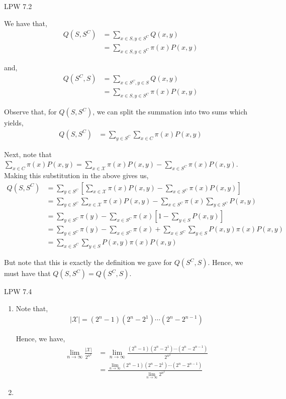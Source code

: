 \documentclass[12pt]{article}
\newenvironment{problem}[2][Problem]{\begin{trivlist}
\item[\hskip \labelsep {\bfseries #1}\hskip \labelsep {\bfseries #2.}]}{\end{trivlist}}
\begin{document}
\begin{problem}{III}
LPW 7.2
\end{problem}

We have that,
\begin{align*}
Q(S, S^C) &= \sum_{x \in S, y \in S^C} Q(x,y)\\
&= \sum_{x \in S, y \in S^C} \pi(x) P(x,y)
\end{align*}

and,
\begin{align*}
Q(S^C, S) &= \sum_{x \in S^C,  y \in S} Q(x, y)\\
&= \sum_{x \in S, y \in S^C} \pi(x) P(x,y)
\end{align*}

Observe that, for $Q(S, S^C)$, we can split the summation into two sums which yields,
\begin{align*}
Q(S, S^C) &= \sum_{y \in S^C} \sum_{x \in C} \pi(x) P(x,y)
\end{align*}

Next, note that $\sum_{x \in C} \pi(x) P(x,y) = \sum_{x \in \mathcal{X}} \pi(x) P(x,y) - \sum_{x \in S^C} \pi(x) P(x,y)$. Making this substitution in the above gives us,
\begin{align*}
Q(S, S^C) &= \sum_{y \in S^C} [\sum_{x \in \mathcal{X}} \pi(x) P(x,y) - \sum_{x \in S^C} \pi(x) P(x,y)]\\
&= \sum_{y \in S^C} \sum_{x \in \mathcal{X}} \pi(x) P(x,y) - \sum_{x \in S^C} \pi(x) \sum_{y \in S^C} P(x,y)\\
&= \sum_{y \in S^C} \pi(y) - \sum_{x \in S^C} \pi(x) \left[ 1 - \sum_{y \in S} P(x, y) \right]\\
&= \sum_{y \in S^C} \pi(y) - \sum_{x \in S^C} \pi(x) + \sum_{x \in S^C} \sum_{y \in S} P(x, y) \pi(x) P(x, y)\\
&= \sum_{x \in S^C} \sum_{y \in S} P(x, y) \pi(x) P(x, y)
\end{align*}

But note that this is exactly the definition we gave for $Q(S^C, S)$. Hence, we must have that $Q(S, S^C) = Q(S^C, S)$.

\newpage
\begin{problem}{IV}
LPW 7.4
\end{problem}

\begin{enumerate}[label=(\alph*)]

\item Note that,
\begin{align*}
|\mathcal{X}| = (2^n - 1)(2^n - 2^1) \cdots (2^n - 2^{n-1})
\end{align*}

Hence, we have,
\begin{align*}
\lim_{n \to \infty} \frac{|\mathcal{X}|}{2^{n^2}} &= \lim_{n \to \infty} \frac{(2^n - 1)(2^n - 2^1) \cdots (2^n - 2^{n-1})}{2^{n^2}}\\
&= \frac{\lim_{n \to \infty} (2^n - 1)(2^n - 2^1) \cdots (2^n - 2^{n-1})}{\lim_{n \to \infty} 2^{n^2}}
\end{align*}



\item 

\end{enumerate}
\end{document}
